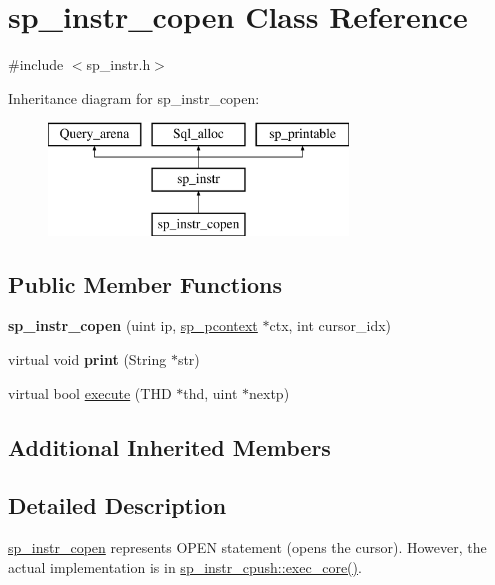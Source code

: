 \hypertarget{classsp__instr__copen}{}\section{sp\+\_\+instr\+\_\+copen Class Reference}
\label{classsp__instr__copen}


{\ttfamily \#include $<$sp\+\_\+instr.\+h$>$}

Inheritance diagram for sp\+\_\+instr\+\_\+copen\+:\begin{figure}[H]
\begin{center}
\leavevmode
\includegraphics[height=3.000000cm]{classsp__instr__copen}
\end{center}
\end{figure}
\subsection*{Public Member Functions}
\begin{DoxyCompactItemize}
\item 
\mbox{\label{classsp__instr__copen_a31a314991d47717b6b4486a7eb4fd00f}} 
{\bfseries sp\+\_\+instr\+\_\+copen} (uint ip, \mbox{\hyperlink{classsp__pcontext}{sp\+\_\+pcontext}} $\ast$ctx, int cursor\+\_\+idx)
\item 
\mbox{\label{classsp__instr__copen_af71e538963410020a075121fe5d5cad2}} 
virtual void {\bfseries print} (String $\ast$str)
\item 
virtual bool \mbox{\hyperlink{classsp__instr__copen_af627252195677aeb974ac0a704c50dbf}{execute}} (T\+HD $\ast$thd, uint $\ast$nextp)
\end{DoxyCompactItemize}
\subsection*{Additional Inherited Members}


\subsection{Detailed Description}
\mbox{\hyperlink{classsp__instr__copen}{sp\+\_\+instr\+\_\+copen}} represents O\+P\+EN statement (opens the cursor). However, the actual implementation is in \mbox{\hyperlink{classsp__instr__cpush_a29936e62ed32e5db6d5a3fdd624fe969}{sp\+\_\+instr\+\_\+cpush\+::exec\+\_\+core()}}. 

